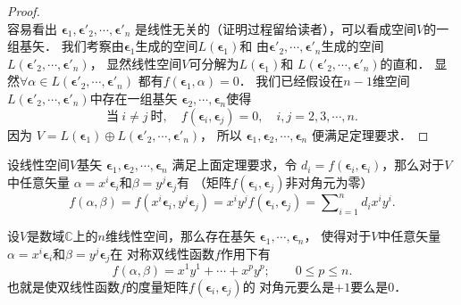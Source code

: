 \begin{proof}
\begin{equation*}
    \end{equation*}
    容易看出
    $\boldsymbol{\epsilon}_1,\boldsymbol{\epsilon}'_2,\cdots,\boldsymbol{\epsilon}'_n$
    是线性无关的（证明过程留给读者），可以看成空间$V$的一组基矢．
    我们考察由$\boldsymbol{\epsilon}_1$生成的空间$L(\boldsymbol{\epsilon}_1)$和
    由$\boldsymbol{\epsilon}'_2,\cdots,\boldsymbol{\epsilon}'_n$生成的空间
    $L(\boldsymbol{\epsilon}'_2,\cdots,\boldsymbol{\epsilon}'_n)$，
    显然线性空间$V$可分解为$L(\boldsymbol{\epsilon}_1)$和
    $L(\boldsymbol{\epsilon}'_2,\cdots,\boldsymbol{\epsilon}'_n)$的{\kaishu 直和}．
    显然$\forall \alpha \in L(\boldsymbol{\epsilon}'_2,\cdots,\boldsymbol{\epsilon}'_n)$
    都有$f(\boldsymbol{\epsilon}_1,\alpha)=0$．
    我们已经假设在$n-1$维空间
    $L(\boldsymbol{\epsilon}'_2,\cdots,\boldsymbol{\epsilon}'_n)$中存在一组基矢
    $\boldsymbol{\epsilon}_2,\cdots,\boldsymbol{\epsilon}_n$使得
    \begin{equation*}
        \text{当} \ i \neq j \ \text{时}, \quad
        f(\boldsymbol{\epsilon}_i,\boldsymbol{\epsilon}_j) = 0,
        \quad i,j=2,3,\cdots, n.
    \end{equation*}
    因为
    $V=L(\boldsymbol{\epsilon}_1) \oplus
    L(\boldsymbol{\epsilon}'_2,\cdots,\boldsymbol{\epsilon}'_n)$，
    所以
    $\boldsymbol{\epsilon}_1,\boldsymbol{\epsilon}_2,\cdots,\boldsymbol{\epsilon}_n$
    便满足定理要求．
\end{proof}


设线性空间$V$基矢
$\boldsymbol{\epsilon}_1,\boldsymbol{\epsilon}_2,\cdots,\boldsymbol{\epsilon}_n$
满足上面定理要求，令
$d_i = f(\boldsymbol{\epsilon}_i,\boldsymbol{\epsilon}_i)$，那么对于$V$中任意矢量
$\alpha = x^i \boldsymbol{\epsilon}_i$和$\beta = y^j \boldsymbol{\epsilon}_j$有
（矩阵$f(\boldsymbol{\epsilon}_i,\boldsymbol{\epsilon}_j)$非对角元为零）
\begin{equation}\label{chmla:eqn_tmp10}
    f(\alpha,\beta)=f(x^i \boldsymbol{\epsilon}_i,y^j \boldsymbol{\epsilon}_j)
    =x^i y^j f( \boldsymbol{\epsilon}_i, \boldsymbol{\epsilon}_j)
    =\sum\nolimits_{i=1}^{n} d_i x^i y^i .
\end{equation}

\begin{corollary}\label{chmla:thm_pm1num-comp}
    设$V$是数域$\mathbb{C}$上的$n$维线性空间，那么存在基矢
    $\boldsymbol{\epsilon}_1,\cdots,\boldsymbol{\epsilon}_n$，
    使得对于$V$中任意矢量
    $\alpha = x^i \boldsymbol{\epsilon}_i$和$\beta = y^j \boldsymbol{\epsilon}_j$在
    对称双线性函数$f$作用下有
    \begin{equation}\label{chmla:eqn_gmetric-comp}
        f(\alpha,\beta)= x^1 y^1 + \cdots + x^p y^p;\qquad
        0 \leqslant p \leqslant n.
    \end{equation}
    也就是使双线性函数$f$的度量矩阵$f(\boldsymbol{\epsilon}_i,\boldsymbol{\epsilon}_j)$的
    对角元要么是$+1$要么是$0$．
\end{corollary}


